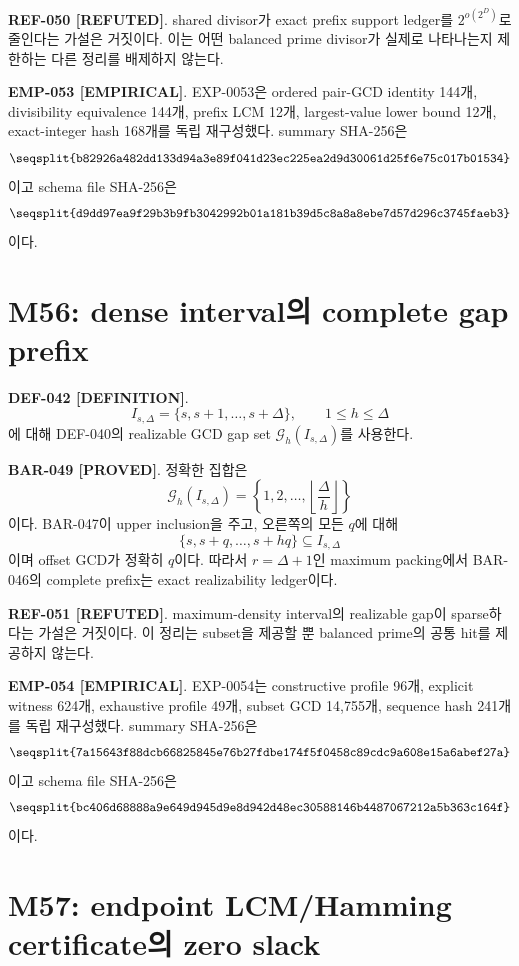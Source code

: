 \documentclass[11pt]{article}
\newcommand{\claimstatus}[2]{\textbf{#1 [#2]}}
\begin{document}
\claimstatus{REF-050}{REFUTED}.
shared divisor가 exact prefix support ledger를 \(2^{o(2^D)}\)로
줄인다는 가설은 거짓이다. 이는 어떤 balanced prime divisor가 실제로
나타나는지 제한하는 다른 정리를 배제하지 않는다.

\claimstatus{EMP-053}{EMPIRICAL}.
EXP-0053은 ordered pair-GCD identity 144개, divisibility equivalence
144개, prefix LCM 12개, largest-value lower bound 12개, exact-integer
hash 168개를 독립 재구성했다. summary SHA-256은
\[
\texttt{\seqsplit{b82926a482dd133d94a3e89f041d23ec225ea2d9d30061d25f6e75c017b01534}}
\]
이고 schema file SHA-256은
\[
\texttt{\seqsplit{d9dd97ea9f29b3b9fb3042992b01a181b39d5c8a8a8ebe7d57d296c3745faeb3}}
\]
이다.

\section{M56: dense interval의 complete gap prefix}

\claimstatus{DEF-042}{DEFINITION}.
\[
I_{s,\Delta}=\{s,s+1,\ldots,s+\Delta\},
\qquad 1\le h\le\Delta
\tag{M56.1}
\]
에 대해 DEF-040의 realizable GCD gap set
\(\mathcal G_h(I_{s,\Delta})\)를 사용한다.

\claimstatus{BAR-049}{PROVED}.
정확한 집합은
\[
\mathcal G_h(I_{s,\Delta})
=\left\{1,2,\ldots,
\left\lfloor\frac{\Delta}{h}\right\rfloor\right\}
\tag{M56.2}
\]
이다. BAR-047이 upper inclusion을 주고, 오른쪽의 모든 \(q\)에 대해
\[
\{s,s+q,\ldots,s+hq\}\subseteq I_{s,\Delta}
\tag{M56.3}
\]
이며 offset GCD가 정확히 \(q\)이다. 따라서 \(r=\Delta+1\)인 maximum
packing에서 BAR-046의 complete prefix는 exact realizability
ledger이다.

\claimstatus{REF-051}{REFUTED}.
maximum-density interval의 realizable gap이 sparse하다는 가설은
거짓이다. 이 정리는 subset을 제공할 뿐 balanced prime의 공통 hit를
제공하지 않는다.

\claimstatus{EMP-054}{EMPIRICAL}.
EXP-0054는 constructive profile 96개, explicit witness 624개,
exhaustive profile 49개, subset GCD 14,755개, sequence hash 241개를
독립 재구성했다. summary SHA-256은
\[
\texttt{\seqsplit{7a15643f88dcb66825845e76b27fdbe174f5f0458c89cdc9a608e15a6abef27a}}
\]
이고 schema file SHA-256은
\[
\texttt{\seqsplit{bc406d68888a9e649d945d9e8d942d48ec30588146b4487067212a5b363c164f}}
\]
이다.

\section{M57: endpoint LCM/Hamming certificate의 zero slack}
\end{document}
